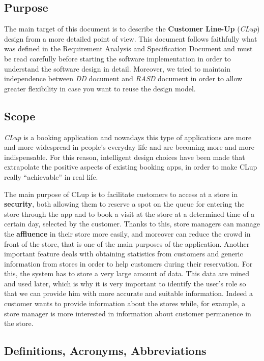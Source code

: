 \documentclass{article}
\begin{document}
	\subsection{Purpose}
	The main target of this document is to describe the {\bfseries Customer Line-Up} (\emph{CLup}) design from a more detailed point of view. This document follows faithfully what was defined in the Requirement Analysis and Specification Document and must be read carefully before starting the software implementation in order to understand the software design in detail. Moreover, we tried to maintain independence between \emph{DD} document and \emph{RASD} document in order to allow greater flexibility in case you want to reuse the design model.
	
	\subsection{Scope}
	\emph{CLup} is a booking application and nowadays this type of applications are more and more widespread in people's everyday life and are becoming more and more indispensable. For this reason, intelligent design choices have been made that extrapolate the positive aspects of existing booking apps, in order to make CLup really “achievable” in real life.
	
	The main purpose of CLup is to facilitate customers to access at a store in {\bfseries security}, both allowing them to reserve a spot on the queue for entering the store through the app and to book a visit at the store at a determined time of a certain day, selected by the customer. Thanks to this, store managers can manage the {\bfseries affluence} in their store more easily, and moreover can reduce the crowd in front of the store, that is one of the main purposes of the application. Another important feature deals with obtaining statistics from customers and generic information from stores in order to help customers during their reservation. For this, the system has to store a very large amount of data. This data are mined and used later, which is why it is very important to identify the user's role so that we can provide him with more accurate and suitable information. Indeed a customer wants to provide information about the stores while, for example, a store manager is more interested in information about customer permanence in the store.
	
	\subsection{Definitions, Acronyms, Abbreviations}
	\bigskip
\end{document}
